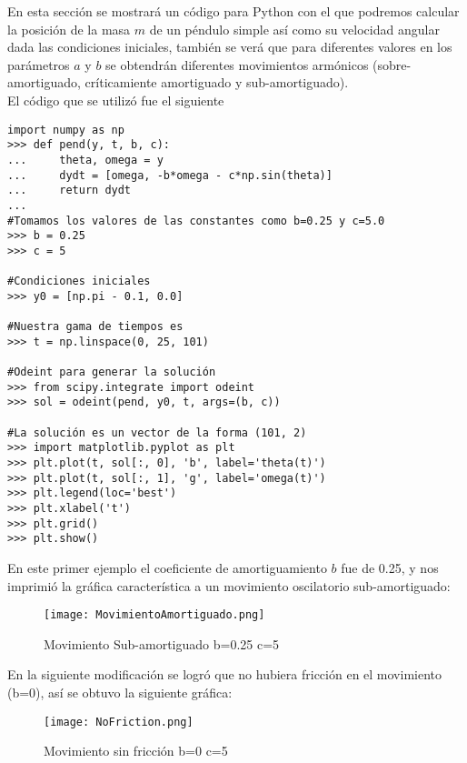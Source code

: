 \documentclass[a4 paper]{article}
\numberwithin{equation}{section}
\newcommand{\0}{\mathbf{0}}
\begin{document}
En esta secci\'on se mostrar\'a un c\'odigo para Python con el que podremos calcular la posici\'on de la masa $m$ de un p\'endulo simple as\'i como su velocidad angular dada las condiciones iniciales, tambi\'en se ver\'a que para diferentes valores en los par\'ametros $a$ y $b$ se obtendr\'an diferentes movimientos armónicos (sobre-amortiguado, cr\'iticamiente amortiguado y sub-amortiguado).\\

El c\'odigo que se utiliz\'o fue el siguiente

\begin{verbatim}
import numpy as np
>>> def pend(y, t, b, c):
...     theta, omega = y
...     dydt = [omega, -b*omega - c*np.sin(theta)]
...     return dydt
...
#Tomamos los valores de las constantes como b=0.25 y c=5.0
>>> b = 0.25
>>> c = 5

#Condiciones iniciales
>>> y0 = [np.pi - 0.1, 0.0]

#Nuestra gama de tiempos es
>>> t = np.linspace(0, 25, 101)

#Odeint para generar la solución
>>> from scipy.integrate import odeint
>>> sol = odeint(pend, y0, t, args=(b, c))

#La solución es un vector de la forma (101, 2)
>>> import matplotlib.pyplot as plt
>>> plt.plot(t, sol[:, 0], 'b', label='theta(t)')
>>> plt.plot(t, sol[:, 1], 'g', label='omega(t)')
>>> plt.legend(loc='best')
>>> plt.xlabel('t')
>>> plt.grid()
>>> plt.show()

\end{verbatim}

En este primer ejemplo el coeficiente de amortiguamiento $b$ fue de 0.25, y nos imprimi\'o la gr\'afica caracter\'istica a un movimiento oscilatorio sub-amortiguado:

\vspace*{0.5cm}
\begin{figure}[!ht]
  \centering
      \texttt{[image: MovimientoAmortiguado.png]}
  \caption{Movimiento Sub-amortiguado b=0.25 c=5}
\end{figure}

En la siguiente modificaci\'on se logr\'o que no hubiera fricci\'on en el movimiento (b=0), as\'i se obtuvo la siguiente gr\'afica:

\begin{figure}[!ht]
  \centering
      \texttt{[image: NoFriction.png]}
  \caption{Movimiento sin fricci\'on b=0 c=5}
\end{figure}
\end{document}
